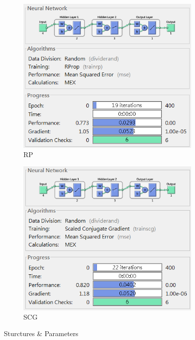 \documentclass[12pt,a4paper]{article}
\begin{document}
\begin{CJK}{UTF8}{bsmi}
\begin{enumerate}
\begin{enumerate}
		 	\begin{figure}[H]
		 		\centering
		 		\begin{subfigure}{.5\textwidth}
		 			\centering
		 			\includegraphics[width=0.92\linewidth]{RP1}
		 			\caption{RP}
		 		
		 		\end{subfigure}%
		 		\begin{subfigure}{.5\textwidth}
		 			\centering
		 			\includegraphics[width=0.92\linewidth]{SCG1}
		 			\caption{SCG}
		 		
		 		\end{subfigure}
		 		\caption{Sturctures \& Parameters}
		 		

\end{figure}
\end{enumerate}
\end{enumerate}
\end{CJK}
\end{document}

